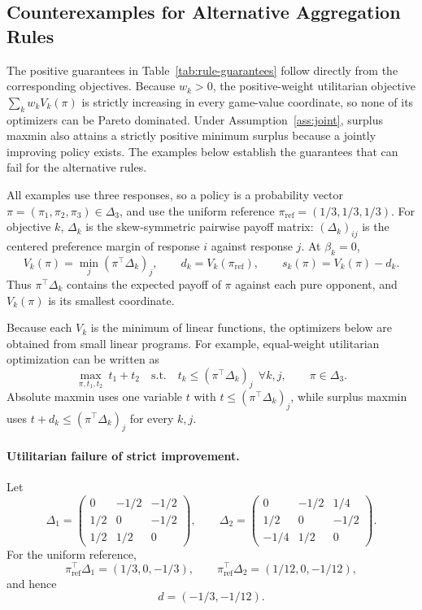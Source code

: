 \documentclass{article}
\theoremstyle{remark}
\theoremstyle{plain}
\newcommand{\piref}{\pi_{\mathrm{ref}}}
\begin{document}
\subsection{Counterexamples for Alternative Aggregation Rules}
\label{app:rule-witnesses}

The positive guarantees in Table~\ref{tab:rule-guarantees} follow
directly from the corresponding objectives. Because $w_k>0$, the
positive-weight utilitarian objective $\sum_k w_k V_k(\pi)$ is strictly
increasing in every game-value coordinate, so none of its optimizers can
be Pareto dominated. Under Assumption~\ref{ass:joint}, surplus maxmin
also attains a strictly positive minimum surplus because a jointly
improving policy exists. The examples below establish the guarantees
that can fail for the alternative rules.

All examples use three responses, so a policy is a probability vector
$\pi=(\pi_1,\pi_2,\pi_3)\in\Delta_3$, and use the uniform reference
$\piref=(1/3,1/3,1/3)$. For objective $k$, $\Delta_k$ is the skew-symmetric
pairwise payoff matrix: $(\Delta_k)_{ij}$ is the centered preference margin of response
$i$ against response $j$. At $\beta_k=0$,
\[
V_k(\pi)
=
\min_j(\pi^\top \Delta_k)_j,
\qquad
d_k=V_k(\piref),
\qquad
s_k(\pi)=V_k(\pi)-d_k.
\]
Thus $\pi^\top \Delta_k$ contains the expected payoff of $\pi$ against each
pure opponent, and $V_k(\pi)$ is its smallest coordinate.

Because each $V_k$ is the minimum of linear functions, the optimizers
below are obtained from small linear programs. For example,
equal-weight utilitarian optimization can be written as
\[
\max_{\pi,t_1,t_2}\ t_1+t_2
\quad\text{s.t.}\quad
t_k\le(\pi^\top \Delta_k)_j
\ \ \forall k,j,\qquad
\pi\in\Delta_3.
\]
Absolute maxmin uses one variable $t$ with
$t\le(\pi^\top \Delta_k)_j$, while surplus maxmin uses
$t+d_k\le(\pi^\top \Delta_k)_j$ for every $k,j$.

\paragraph{Utilitarian failure of strict improvement.}
Let
\[
\Delta_1=
\begin{pmatrix}
0&-1/2&-1/2\\
1/2&0&-1/2\\
1/2&1/2&0
\end{pmatrix},
\qquad
\Delta_2=
\begin{pmatrix}
0&-1/2&1/4\\
1/2&0&-1/2\\
-1/4&1/2&0
\end{pmatrix}.
\]
For the uniform reference,
\[
\piref^\top \Delta_1=(1/3,0,-1/3),
\qquad
\piref^\top \Delta_2=(1/12,0,-1/12),
\]
and hence
\[
d=(-1/3,-1/12).
\]
\end{document}
